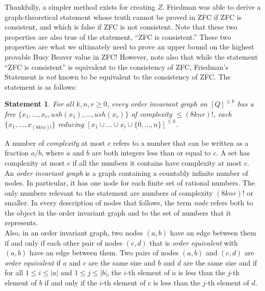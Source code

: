 \documentclass[11pt]{report}
\newtheorem{statement}{Statement}
\begin{document}
Thankfully, a simpler method exists for creating $Z$. Friedman %
was able to derive a graph-theoretical statement whose truth cannot be proved in ZFC if ZFC is consistent, and which is false if ZFC is not consistent. Note that these two properties are also true of the statement, ``ZFC is consistent.'' These two properties are what we ultimately need to prove an upper bound on the highest provable Busy Beaver value in ZFC! However, note also that while the statement ``ZFC is consistent'' is equivalent to the consistency of ZFC, Friedman's Statement is \emph{not} known to be equivalent to the consistency of ZFC. The statement is as follows: \\

\begin{statement}
For all $k, n, r \ge 0$, every order invariant graph on $[Q]^{\le k}$ has a free $\{x_1,\dots,x_r,ush(x_1),...,ush(x_r)\}$ of complexity $\le (8knr)!$, each
$\{x_1, \dots, x_{(8kni)!}\}$ reducing $[x_1 \cup \dots \cup x_i \cup \{0,\dots,n\}]^{\le k}$. %
\label{friedmanstatement}
\end{statement}

A number of \emph{complexity} at most $c$ refers to a number that can be written as a fraction $a/b$, where $a$ and $b$ are both integers less than or equal to $c$. A set has complexity at most $c$ if all the numbers it contains have complexity at most $c$. \\ 

An \emph{order invariant graph} is a graph containing a countably infinite number of nodes. In particular, it has one node for each finite set of rational numbers. The only numbers relevant to the statement are numbers of complexity $(8knr)!$ or smaller. In every description of nodes that follows, the term \emph{node} refers both to the object in the order invariant graph and to the set of numbers that it represents. \\

Also, in an order invariant graph, two nodes $(a,b)$ have an edge between them if and only if each other pair of nodes $(c,d)$ that is \emph{order equivalent} with $(a,b)$ have an edge between them. Two pairs of nodes $(a, b)$ and $(c, d)$ are \emph{order equivalent} if $a$ and $c$ are the same size and $b$ and $d$ are the same size and if for all $1 \le i \le |a|$ and $1 \le j \le |b|$, the $i$-th element of $a$ is less than the $j$-th element of $b$ if and only if the $i$-th element of $c$ is less than the $j$-th element of $d$. \\
\end{document}
